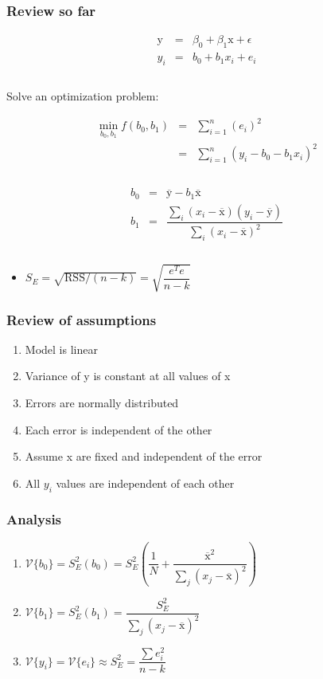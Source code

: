 \begin{frame}\frametitle{Review so far}

	$$
	\begin{array}{rcl}
		\mathrm{y} &=& \beta_0 + \beta_1 \mathrm{x} + \epsilon \\
		y_i &=& b_0 + b_1 x_i + e_i \\
		\\
	\end{array}
	$$

	Solve an optimization problem:

	$$
	\begin{array}{rcl}
		\min_{\displaystyle b_0, b_1} f(b_0, b_1) &=& \sum_{i=1}^{n}{(e_i)^2} \\
		&=& \sum_{i=1}^{n}{\left(y_i - b_0 - b_1 x_i\right)^2} \\
		\\
	\end{array}
	$$

	$$
	\begin{array}{rcl}
		b_0 &=& \overline{\mathrm{y}} - b_1\overline{\mathrm{x}} \\
		b_1 &=& \dfrac{ \sum_i{\left(x_i - \overline{\mathrm{x}}\right)\left(y_i - \overline{\mathrm{y}}\right) } }{ \sum_i{\left( x_i - \overline{\mathrm{x}}\right)^2} } \\
		\\
	\end{array}
	$$
	\begin{itemize}
		\item	$S_E = \sqrt{\text{RSS}/(n-k)} = \sqrt{\dfrac{ e^Te}{n-k}}$
	\end{itemize}
\end{frame}

\begin{frame}\frametitle{Review of assumptions}
	\begin{enumerate}
		\item	Model is linear
		\item	Variance of y is constant at all values of x
		\item	Errors are normally distributed
		\item	Each error is independent of the other
		\item	Assume x are fixed and independent of the error
		\item	All $y_i$ values are independent of each other
	\end{enumerate}
\end{frame}

\begin{frame}\frametitle{Analysis}
	\begin{enumerate}
		\item	$\mathcal{V}\{b_0\} = S_E^2(b_0) = S_E^2 \left(\dfrac{1}{N} + \dfrac{\overline{\mathrm{x}}^2}{\sum_j{\left( x_j - \overline{\mathrm{x}} \right)^2}} \right)$
		\item	$\mathcal{V}\{b_1\} = S_E^2(b_1) = \dfrac{S_E^2}{\sum_j{\left( x_j - \overline{\mathrm{x}} \right)^2}}$
		\item	$\mathcal{V}\{y_i\} = \mathcal{V}\{e_i\} \approx S_E^2 = \dfrac{\sum{e_i^2}}{n-k}$
	\end{enumerate}
\end{frame}

